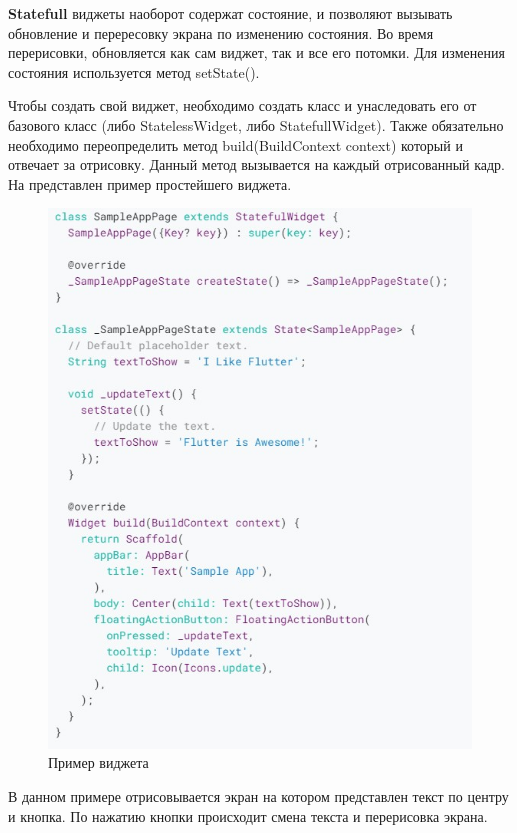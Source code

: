 \textbf{Statefull} виджеты наоборот содержат состояние, и позволяют вызывать обновление и перересовку экрана по изменению состояния. Во время перерисовки, обновляется как сам виджет, так и все его потомки. Для изменения состояния используется метод setState().

Чтобы создать свой виджет, необходимо создать класс и унаследовать его от базового класс (либо StatelessWidget, либо StatefullWidget). Также обязательно необходимо переопределить метод build(BuildContext context) который и отвечает за отрисовку. Данный метод вызывается на каждый отрисованный кадр. На  представлен пример простейшего виджета.

\begin{figure}[ht!] 
	\center
	\includegraphics [scale=0.6] {my_folder/images//flutter_widget}
	\caption{Пример виджета} 
	\label{fig:flutter-widget}  
\end{figure}

В данном примере отрисовывается экран на котором представлен текст по центру и кнопка. По нажатию кнопки происходит смена текста и перерисовка экрана.

